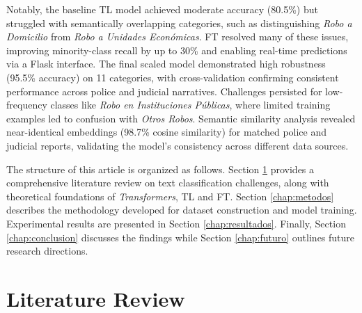 \documentclass[onecolumn, journal, english, 12pt, a4paper]{IEEEtran} %
\theoremstyle{definition}
\begin{document}
Notably, the baseline TL model achieved moderate
accuracy (80.5\%) but struggled with semantically overlapping
categories, such as distinguishing \textit{Robo a Domicilio} from
\textit{Robo a Unidades Económicas}. FT resolved many of
these issues, improving minority-class recall by up to 30\% and
enabling real-time predictions via a Flask interface. The final scaled
model demonstrated high robustness (95.5\% accuracy) on 11 categories,
with cross-validation confirming consistent performance across police
and judicial narratives. Challenges persisted for low-frequency
classes like \textit{Robo en Instituciones Públicas}, where limited
training examples led to confusion with \textit{Otros Robos}. Semantic
similarity analysis revealed near-identical embeddings (98.7\% cosine
similarity) for matched police and judicial reports, validating the
model’s consistency across different data sources.


The structure of this article is organized as follows. Section
\ref{chap:literatura} provides a comprehensive literature review on
text classification challenges, along with theoretical foundations of
\emph{Transformers}, TL and FT. Section
\ref{chap:metodos} describes the methodology developed for dataset
construction and model training. Experimental results are presented in
Section \ref{chap:resultados}. Finally, Section \ref{chap:conclusion}
discusses the findings while Section \ref{chap:futuro} outlines future
research directions.




 

\section{Literature Review}\label{chap:literatura}


\end{document}
